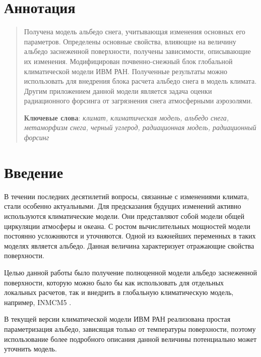 \documentclass[a4paper, fontsize=14pt]{scrartcl}
\begin{document}
\section*{Аннотация}
\begin{abstract}

Получена модель альбедо снега, учитывающая изменения основных его параметров. Определены основные свойства, влияющие на величину альбедо заснеженной поверхности, получены зависимости, описывающие их изменения. Модифицирован почвенно-снежный блок глобальной климатической модели ИВМ РАН. Полученные результаты можно использовать для внедрения блока расчета альбедо снега в модель климата. Другим приложением данной модели является задача оценки радиационного форсинга от загрязнения снега атмосферными аэрозолями. 
  
  \bigskip
  \textbf{Ключевые слова}: \emph{климат, климатическая модель, альбедо снега, метаморфизм снега, черный углерод, радиационная модель, радиационный форсинг}
\end{abstract}


\newpage
{}
{}
\tableofcontents


\newpage
\section*{Введение}

В течении последних десятилетий вопросы, связанные с изменениями климата, стали особенно актуальными. Для предсказания будущих изменений активно используются климатические модели. Они представляют собой модели общей циркуляции атмосферы и океана. С ростом вычислительных мощностей модели постоянно усложняются и уточняются. Одной из важнейших переменных в таких моделях является альбедо. Данная величина характеризует отражающие свойства поверхности.

Целью данной работы было получение полноценной модели альбедо заснеженной поверхности, которую можно было бы как использовать для отдельных локальных расчетов, так и внедрить в глобальную климатическую модель, например, INMCM5 \cite{Volodin2017}.  

В текущей версии климатической модели ИВМ РАН реализована простая параметризация альбедо, зависящая только от температуры поверхности, поэтому использование более подробного описания данной величины потенциально может уточнить модель. 
\end{document}
